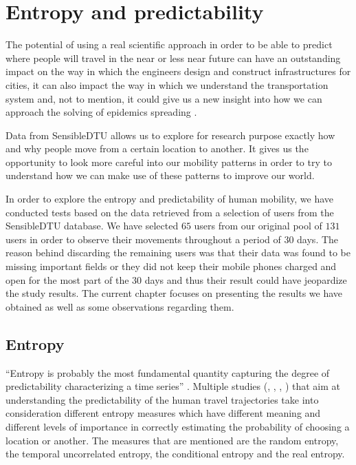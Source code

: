 \chapter{Entropy and predictability}

The potential of using a real scientific approach in order to be able to predict
where people will travel in the near or less near future can have an outstanding
impact on the way in which the engineers design and construct infrastructures
for cities, it can also impact the way in which we understand the transportation
system and, not to mention, it could give us a new insight into how we can
approach the solving of epidemics spreading \cite{Lu13} \cite{Brockmann08}.

Data from SensibleDTU \cite{Stopczynski14m} allows us to explore for research
purpose exactly how and why people move from a certain location to another. It
gives us the opportunity to look more careful into our mobility patterns in
order to try to understand how we can make use of these patterns to improve our
world.

In order to explore the entropy and predictability of human mobility, we have
conducted tests based on the data retrieved from a selection of users from the
SensibleDTU database. We have selected $65$ users from our original pool of
$131$ users in order to observe their movements throughout a period of $30$
days. The reason behind discarding the remaining users was that their data was
found to be missing important fields or they did not keep their mobile phones
charged and open for the most part of the $30$ days and thus their result could
have jeopardize the study results. The current chapter focuses on presenting the
results we have obtained as well as some observations regarding them.

\section{Entropy}

``Entropy is probably the most fundamental quantity capturing the degree of
predictability characterizing a time series'' \cite{Barabasi10}. Multiple
studies (\cite{Sinatra14}, \cite{Lu13}, \cite{marin2012exploring},
\cite{Barabasi10}) that aim at understanding the predictability of the human
travel trajectories take into consideration different entropy measures which
have different meaning and different levels of importance in correctly
estimating the probability of choosing a location or another. The measures that
are mentioned are the random entropy, the temporal uncorrelated entropy, the
conditional entropy and the real entropy.

